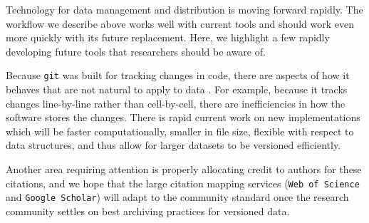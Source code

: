 \documentclass[a4paper,11pt]{article}
\begin{document}
Technology for data management and distribution is moving forward rapidly.  The workflow we describe above works well with current tools and should work even more quickly with its future replacement.  Here, we highlight a few rapidly developing future tools that researchers should be aware of.

Because \texttt{git} was built for tracking changes in code, there are aspects of how it behaves that are not natural to apply to  data \cite{Perkel-2016}.  For example, because it tracks changes line-by-line rather than cell-by-cell, there are inefficiencies in how the software stores the changes.
There is rapid current work on new implementations which will be faster computationally, smaller in file size, flexible with respect to data structures, and thus allow for larger datasets to be versioned efficiently\citep{Fli, Dat}.

Another area requiring attention is properly allocating credit to authors for these citations, and we hope that the large citation mapping services (\texttt{Web of Science} and \texttt{Google Scholar}) will adapt to the community standard once the research community settles on best archiving practices for versioned data.


\end{document}
